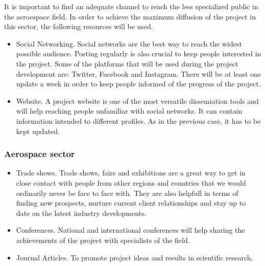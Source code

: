 It is important to find an adequate channel to reach the less specialized public in the aeroespace field. In order to achieve the maximum diffusion of the project in this sector,  the following resources will be used.

\begin{itemize}
\item{ 
	Social Networking. Social networks are the best way to reach the widest possible audience. Posting regularly is also crucial to keep people interested in the project. Some of the platforms that will be used during the project development are: Twitter, Facebook and Instagram. There will be at least one update a week in order to keep people informed of the progress of the project.
}
\item {
	Website. A project website is one of the most versatile dissemiation tools and will help reaching people unfamiliar with social networks. It can contain information intended to different profiles. As in the previous case, it has to be kept updated.
}
\end{itemize}

\subsubsection{Aerospace sector}


\begin{itemize}

\item{
	Trade shows. Trade shows, fairs and exhibitions are a great way to get in close contact with people from other regions and countries that we would ordinarily never be face to face with. They are also helpfull in terms of finding new prospects, nurture current client relationships and stay up to date on the latest industry developments. 
}
\item {
	Conferences. National and international conferences will help sharing the achievements of the project with specialists of the field.
}
\item {
	Journal Articles. To promote project ideas and results in scientific research.
}
\end{itemize}